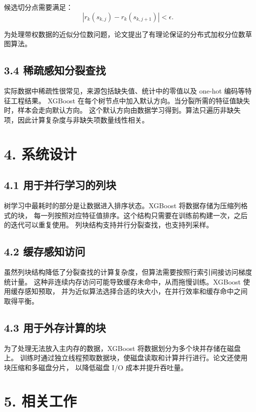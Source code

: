 候选切分点需要满足：
\[
  |r_k(s_{k,j})-r_k(s_{k,j+1})|<\epsilon.
\]

为处理带权数据的近似分位数问题，论文提出了有理论保证的分布式加权分位数草图算法。

\subsection{3.4 稀疏感知分裂查找}

实际数据中稀疏性很常见，来源包括缺失值、统计中的零值以及 one-hot 编码等特征工程结果。
XGBoost 在每个树节点中加入默认方向。当分裂所需的特征值缺失时，样本会走向默认方向。
这个默认方向由数据学习得到。算法只遍历非缺失项，因此计算复杂度与非缺失项数量线性相关。

\section{4. 系统设计}

\subsection{4.1 用于并行学习的列块}

树学习中最耗时的部分是让数据进入排序状态。XGBoost 将数据存储为压缩列格式的块，
每一列按照对应特征值排序。这个结构只需要在训练前构建一次，之后的迭代可以重复使用。
列块结构支持并行分裂查找，也支持列采样。

\subsection{4.2 缓存感知访问}

虽然列块结构降低了分裂查找的计算复杂度，但算法需要按照行索引间接访问梯度统计量。
这种非连续内存访问可能导致缓存未命中，从而拖慢训练。XGBoost 使用缓存感知预取，
并为近似算法选择合适的块大小，在并行效率和缓存命中之间取得平衡。

\subsection{4.3 用于外存计算的块}

为了处理无法放入主内存的数据，XGBoost 将数据划分为多个块并存储在磁盘上。
训练时通过独立线程预取数据块，使磁盘读取和计算并行进行。论文还使用块压缩和多磁盘分片，
以降低磁盘 I/O 成本并提升吞吐量。

\section{5. 相关工作}

